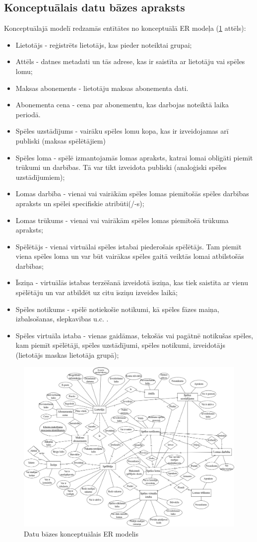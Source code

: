 \subsection{Konceptuālais datu bāzes apraksts}
Konceptuālajā modelī redzamās entītātes no konceptuālā ER modeļa (\ref{fig:conceptual-model} attēls):
\begin{itemize}
	\item Lietotājs - reģistrēts lietotājs, kas pieder noteiktai grupai;
	\item Attēls - datnes metadati un tās adrese, kas ir saistīta ar lietotāju vai spēles lomu;
	\item Maksas abonements - lietotāju maksas abonementa dati.
	\item Abonementa cena - cena par abonementu, kas darbojas noteiktā laika periodā.
	\item Spēles uzstādījums - vairāku spēles lomu kopa, kas ir izveidojamas arī publiski (maksas spēlētājiem)
	\item Spēles loma - spēlē izmantojamās lomas apraksts, katrai lomai obligāti piemīt trūkumi un darbības. Tā var tikt izveidota publiski (analoģiski spēles uzstādījumiem);
	\item Lomas darbība - vienai vai vairākām spēles lomas piemītošās spēles darbības apraksts un spēlei specifiskie atribūti(/-s);
	\item Lomas trūkums - vienai vai vairākām spēles lomas piemītošā trūkuma apraksts;
	\item Spēlētājs - vienai virtuālai spēles istabai piederošais spēlētājs. Tam piemīt viena spēles loma un var būt vairākas spēles gaitā veiktās lomai atbilstošās darbības;
	\item Īsziņa - virtuālās istabas terzēšanā izveidotā īsziņa, kas tiek saistīta ar vienu spēlētāju  un var atbildēt uz citu īsziņu izveides laikā;
	\item Spēles notikums - spēlē notiekošie notikumi, kā spēles fāzes maiņa, izbalsošanas, slepkavības u.c. .
	\item Spēles virtuāla istaba - vienas gaidāmas, tekošās vai pagātnē notikušas spēles, kam piemīt spēlētāji, spēles uzstādījumi, spēles notikumi, izveidotājs (lietotājs maskas lietotāja grupā);
\end{itemize}

\begin{figure}[htbp]
	\centering
	\includegraphics[width=\linewidth]{./src/img/KonceptualaisERModelis.png}
	\caption{Datu bāzes konceptuālais ER modelis}
	\label{fig:conceptual-model}
\end{figure}
